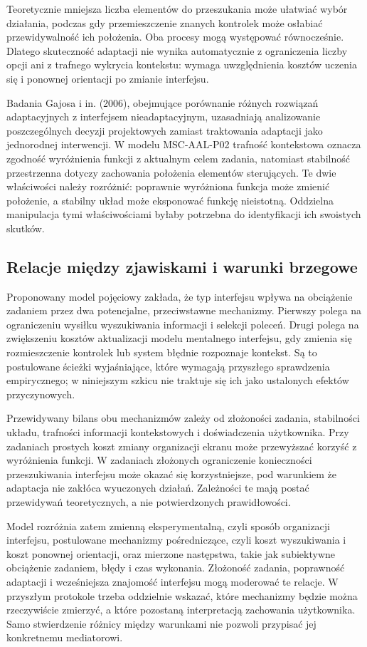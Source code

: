 \documentclass[11pt,a4paper]{article}
\begin{document}
Teoretycznie mniejsza liczba elementów do przeszukania może ułatwiać wybór działania, podczas gdy przemieszczenie znanych kontrolek może osłabiać przewidywalność ich położenia. Oba procesy mogą występować równocześnie. Dlatego skuteczność adaptacji nie wynika automatycznie z ograniczenia liczby opcji ani z trafnego wykrycia kontekstu: wymaga uwzględnienia kosztów uczenia się i ponownej orientacji po zmianie interfejsu.

Badania Gajosa i in. (2006), obejmujące porównanie różnych rozwiązań adaptacyjnych z interfejsem nieadaptacyjnym, uzasadniają analizowanie poszczególnych decyzji projektowych zamiast traktowania adaptacji jako jednorodnej interwencji. W modelu MSC-AAL-P02 trafność kontekstowa oznacza zgodność wyróżnienia funkcji z aktualnym celem zadania, natomiast stabilność przestrzenna dotyczy zachowania położenia elementów sterujących. Te dwie właściwości należy rozróżnić: poprawnie wyróżniona funkcja może zmienić położenie, a stabilny układ może eksponować funkcję nieistotną. Oddzielna manipulacja tymi właściwościami byłaby potrzebna do identyfikacji ich swoistych skutków.

\subsection{Relacje między zjawiskami i warunki brzegowe}

Proponowany model pojęciowy zakłada, że typ interfejsu wpływa na obciążenie zadaniem przez dwa potencjalne, przeciwstawne mechanizmy. Pierwszy polega na ograniczeniu wysiłku wyszukiwania informacji i selekcji poleceń. Drugi polega na zwiększeniu kosztów aktualizacji modelu mentalnego interfejsu, gdy zmienia się rozmieszczenie kontrolek lub system błędnie rozpoznaje kontekst. Są to postulowane ścieżki wyjaśniające, które wymagają przyszłego sprawdzenia empirycznego; w niniejszym szkicu nie traktuje się ich jako ustalonych efektów przyczynowych.

Przewidywany bilans obu mechanizmów zależy od złożoności zadania, stabilności układu, trafności informacji kontekstowych i doświadczenia użytkownika. Przy zadaniach prostych koszt zmiany organizacji ekranu może przewyższać korzyść z wyróżnienia funkcji. W zadaniach złożonych ograniczenie konieczności przeszukiwania interfejsu może okazać się korzystniejsze, pod warunkiem że adaptacja nie zakłóca wyuczonych działań. Zależności te mają postać przewidywań teoretycznych, a nie potwierdzonych prawidłowości.

Model rozróżnia zatem zmienną eksperymentalną, czyli sposób organizacji interfejsu, postulowane mechanizmy pośredniczące, czyli koszt wyszukiwania i koszt ponownej orientacji, oraz mierzone następstwa, takie jak subiektywne obciążenie zadaniem, błędy i czas wykonania. Złożoność zadania, poprawność adaptacji i wcześniejsza znajomość interfejsu mogą moderować te relacje. W przyszłym protokole trzeba oddzielnie wskazać, które mechanizmy będzie można rzeczywiście zmierzyć, a które pozostaną interpretacją zachowania użytkownika. Samo stwierdzenie różnicy między warunkami nie pozwoli przypisać jej konkretnemu mediatorowi.
\end{document}
